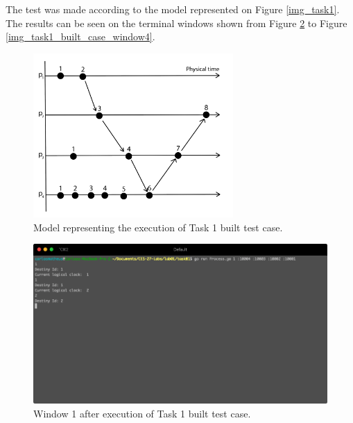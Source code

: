 \documentclass[a4paper, 11pt]{article}
\begin{document}
The test was made according to the model represented on Figure \ref{img_task1}. The results can be seen on the terminal windows shown from Figure \ref{img_task1_built_case_window1} to Figure \ref{img_task1_built_case_window4}.


\begin{figure}[h]
  \begin{center}
  \includegraphics[width=3in]{./imgs/task1_built_case_model.png}
  \caption{Model representing the execution of Task 1 built test case.}
  \label{img_task1_built_case_model}
  \end{center}
\end{figure}






\begin{figure}[h]
  \begin{center}
  \includegraphics[width=4.5in]{./imgs/task1_buit_test_window1.png}
  \caption{Window 1 after execution of Task 1 built test case.}
  \label{img_task1_built_case_window1}
  \end{center}
\end{figure}
\end{document}

